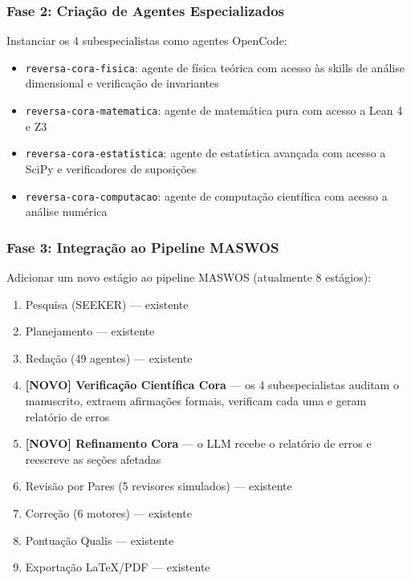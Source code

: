 \documentclass[5p]{elsarticle}
\theoremstyle{remark}
\begin{document}
\subsubsection{Fase 2: Criação de Agentes Especializados}

Instanciar os 4 subespecialistas como agentes OpenCode:

\begin{itemize}
    \item \texttt{reversa-cora-fisica}: agente de física teórica com acesso às skills de análise dimensional e verificação de invariantes
    \item \texttt{reversa-cora-matematica}: agente de matemática pura com acesso a Lean 4 e Z3
    \item \texttt{reversa-cora-estatistica}: agente de estatística avançada com acesso a SciPy e verificadores de suposições
    \item \texttt{reversa-cora-computacao}: agente de computação científica com acesso a análise numérica
\end{itemize}

\subsubsection{Fase 3: Integração ao Pipeline MASWOS}

Adicionar um novo estágio ao pipeline MASWOS (atualmente 8 estágios):

\begin{enumerate}
    \item Pesquisa (SEEKER) --- existente
    \item Planejamento --- existente
    \item Redação (49 agentes) --- existente
    \item \textbf{[NOVO] Verificação Científica Cora} --- os 4 subespecialistas auditam o manuscrito, extraem afirmações formais, verificam cada uma e geram relatório de erros
    \item \textbf{[NOVO] Refinamento Cora} --- o LLM recebe o relatório de erros e reescreve as seções afetadas
    \item Revisão por Pares (5 revisores simulados) --- existente
    \item Correção (6 motores) --- existente
    \item Pontuação Qualis --- existente
    \item Exportação LaTeX/PDF --- existente
\end{enumerate}
\end{document}
